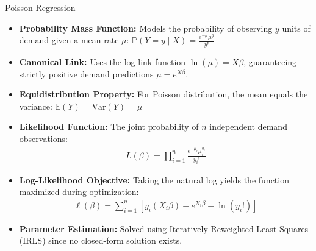 \documentclass[11pt]{beamer}
\begin{document}
\begin{frame}[allowframebreaks]{Poisson Regression}
\begin{small}
\begin{itemize}
\item \textbf{Probability Mass Function:} Models the probability of observing $y$ units of demand given a mean rate $\mu$: $\mathbb{P}(Y=y\mid X)=\frac{e^{-\mu}\mu ^{y}}{y!}$
\item \textbf{Canonical Link:} Uses the log link function $\ln(\mu) = X\beta$, guaranteeing strictly positive demand predictions $\mu = e^{X\beta}$.
\item \textbf{Equidistribution Property:} For Poisson distribution, the mean equals the variance: $\mathbb{E}(Y)=\text{Var}(Y)=\mu $
\item \textbf{Likelihood Function:} The joint probability of $n$ independent demand observations: 
\begin{align*} L(\beta )=\prod _{i=1}^{n}\frac{e^{-\mu_{i}}\mu _{i}^{y_{i}}}{y_{i}!} \end{align*}
\item \textbf{Log-Likelihood Objective:} Taking the natural log yields the function maximized during optimization: 
\begin{align*} \ell (\beta )=\sum _{i=1}^{n}\left[y_{i}(X_{i}\beta )-e^{X_{i}\beta }-\ln (y_{i}!)\right] \end{align*}
\item \textbf{Parameter Estimation:} Solved using Iteratively Reweighted Least Squares (IRLS) since no closed-form solution exists.
\end{itemize}
\end{small}
\end{frame}
\end{document}
